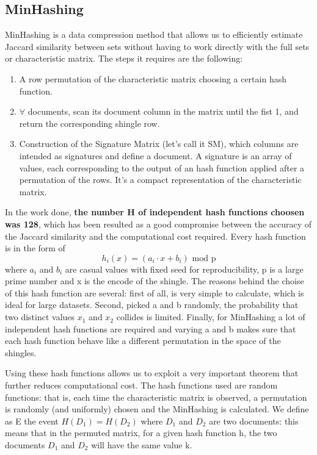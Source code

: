 \documentclass[12pt, a4paper]{article}
\begin{document}
\subsection{MinHashing}
MinHashing is a data compression method that allows us to efficiently estimate Jaccard similarity between sets without having to work directly with the full sets or characteristic matrix. The steps it requires are the following: 
\begin{enumerate}
    \item A row permutation of the characteristic matrix choosing a certain hash function.
    \item $\forall$ documents, scan its document column in the matrix until the fist 1, and return the corresponding shingle row.
    \item Construction of the Signature Matrix (let's call it SM), which columns are intended as signatures and define a document. A signature is an array of values, each corresponding to the output of an hash function applied after a permutation of the rows. It's a compact representation of the characteristic matrix.
\end{enumerate}
In the work done, \textbf{the number H of independent hash functions choosen was 128}, which has been resulted as a good compromise between the accuracy of the Jaccard similarity and the computational cost required. Every hash function is in the form of
\begin{equation}
    h_i(x) = (a_i\cdot x + b_i) \text{ mod p} 
\end{equation}
where $a_i$ and $b_i$ are casual values with fixed seed for reproducibility, p is a large prime number and x is the encode of the shingle. The reasons behind the choise of this hash function are several: first of all, is very simple to calculate, which is ideal for large datasets. Second, picked a and b randomly, the probability that two distinct values $x_1$ and $x_2$ collides is limited. Finally, for MinHashing a lot of independent hash functions are required and varying a and b makes sure that each hash function behave like a different permutation in the space of the shingles. 


Using these hash functions allows us to exploit a very important theorem that further reduces computational cost. The hash functions used are random functions: that is, each time the characteristic matrix is observed, a permutation is randomly (and uniformly) chosen and the MinHashing is calculated. We define as E the event $H(D_1) = H(D_2)$ where $D_1$ and $D_2$ are two documents: this means that in the permuted matrix, for a given hash function h, the two documents $D_1$ and $D_2$ will have the same value k.
\end{document}
